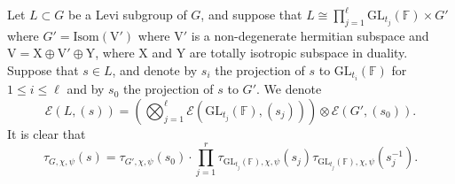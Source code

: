 \documentclass[12pt, reqno]{amsart}
\theoremstyle{definition}
\theoremstyle{definition}
\theoremstyle{definition}
\newcommand{\hermitianSpace}{\mathrm{V}}
\newcommand{\xIsotropic}{\mathrm{X}}
\newcommand{\yIsotropic}{\mathrm{Y}}
\newcommand{\fieldCharacter}{\psi}
\newcommand{\GL}{\mathrm{GL}}
\newcommand{\finiteField}{\mathbb{F}}
\newcommand{\IsometryGroup}{\mathrm{Isom}}
\newcommand{\LusztigSeries}[2]{\mathcal{E}\left(#1, (#2)\right)}
\begin{document}
Let $L \subset G$ be a Levi subgroup of $G$, and suppose that $L \cong \prod_{j=1}^\ell \GL_{t_j}\left(\finiteField\right) \times G'$ where $G' = \IsometryGroup\left(\hermitianSpace'\right)$ where $\hermitianSpace'$ is a non-degenerate hermitian subspace and $\hermitianSpace = \xIsotropic \oplus \hermitianSpace' \oplus \yIsotropic$, where $\xIsotropic$ and $\yIsotropic$ are totally isotropic subspace in duality. Suppose that $s \in L$, and denote by $s_i$ the projection of $s$ to $\GL_{t_i}\left(\finiteField\right)$ for $1 \le i \le \ell$ and by $s_0$ the projection of $s$ to $G'$. We denote
$$\LusztigSeries{L}{s} = \left(\bigotimes_{j=1}^{\ell} \LusztigSeries{\GL_{t_j}\left(\finiteField\right)}{s_j}\right) \otimes \LusztigSeries{G'}{s_0}.$$
It is clear that $$\tau_{G, \chi, \fieldCharacter}\left(s\right) = \tau_{G', \chi, \fieldCharacter}\left(s_0\right) \cdot \prod_{j=1}^r \tau_{\GL_{t_j}\left(\finiteField\right), \chi, \fieldCharacter}\left(s_j\right) \tau_{\GL_{t_j}\left(\finiteField\right), \chi, \fieldCharacter}\left(s_j^{-1}\right).$$
\end{document}

